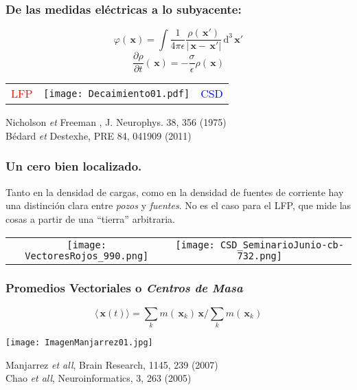 \documentclass{beamer}
\newcommand{\dd}{\, \mathrm{d}}
\newcommand{\xq}{\, \mathbf{x}}
\begin{document}
\begin{frame}
  \frametitle{De las medidas eléctricas a lo subyacente:} 
  \begin{equation}
    \varphi(\xq)
    =\int \frac{1}{4\pi\epsilon}
    \frac{\rho(\xq')}{|\xq-\xq'|} \dd^3 \xq'  
  \end{equation}
    \begin{equation}
      \frac{\partial \rho}{\partial{t}}(\xq)=
      -\frac{\sigma}{\epsilon}\rho(\xq)
    \end{equation}
  \begin{center}
  \begin{tabular}{ccc}
   \textcolor{red}{LFP} & 
   \texttt{[image: Decaimiento01.pdf]} &
   \textcolor{blue}{CSD}
  \end{tabular}
  \end{center}
  {\tiny Nicholson \emph{et} Freeman , J.   Neurophys. 38, 356 (1975)\\
         Bédard \emph{et} Destexhe, PRE 84, 041909 (2011) }
\end{frame}





\begin{frame}
\frametitle{Un cero bien localizado.} 
Tanto en la densidad de cargas, como en la densidad de fuentes de corriente
hay una distinción clara entre \emph{pozos} y \emph{fuentes}.
No es el caso para el LFP, que mide las cosas a partir de una ``tierra''
arbitraria.

\begin{tabular}{cc}
      \texttt{[image: VectoresRojos\_990.png]} &
    \texttt{[image: CSD\_SeminarioJunio-cb-732.png]} 
\end{tabular}
\end{frame}


\begin{frame}
  \frametitle{Promedios Vectoriales o \emph{Centros de Masa}}
  \begin{equation}
    \langle \xq(t) \rangle=\sum_k m(\xq_k)\xq/\sum_k m(\xq_k)
  \end{equation}
  
  \begin{center}
    \texttt{[image: ImagenManjarrez01.jpg]}
  \end{center} 
  
 \begin{flushright}
  {\tiny  Manjarrez \emph{ et all}, Brain Research, 1145, 239 (2007) \\
      Chao \emph{ et all}, Neuroinformatics, 3, 263 (2005) }
  \end{flushright}

\end{frame}
\end{document}
